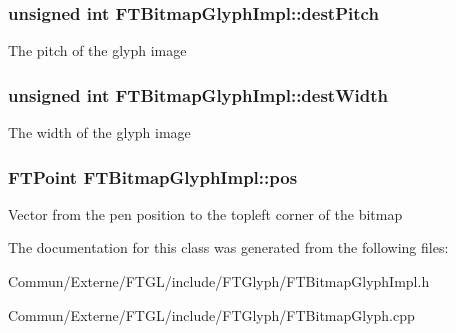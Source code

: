 \subsubsection[{\texorpdfstring{dest\+Pitch}{destPitch}}]{\setlength{\rightskip}{0pt plus 5cm}unsigned int F\+T\+Bitmap\+Glyph\+Impl\+::dest\+Pitch\hspace{0.3cm}{\ttfamily [private]}}\hypertarget{class_f_t_bitmap_glyph_impl_adf2486f483a57fa6c2b58d12f68df6d2}{}\label{class_f_t_bitmap_glyph_impl_adf2486f483a57fa6c2b58d12f68df6d2}
The pitch of the glyph \textquotesingle{}image\textquotesingle{} 
\subsubsection[{\texorpdfstring{dest\+Width}{destWidth}}]{\setlength{\rightskip}{0pt plus 5cm}unsigned int F\+T\+Bitmap\+Glyph\+Impl\+::dest\+Width\hspace{0.3cm}{\ttfamily [private]}}\hypertarget{class_f_t_bitmap_glyph_impl_aee68c29c0749aa4dff423954c72eb3d1}{}\label{class_f_t_bitmap_glyph_impl_aee68c29c0749aa4dff423954c72eb3d1}
The width of the glyph \textquotesingle{}image\textquotesingle{} 
\subsubsection[{\texorpdfstring{pos}{pos}}]{\setlength{\rightskip}{0pt plus 5cm}F\+T\+Point F\+T\+Bitmap\+Glyph\+Impl\+::pos\hspace{0.3cm}{\ttfamily [private]}}\hypertarget{class_f_t_bitmap_glyph_impl_acdbd483a1ecd327916a7673ba959f747}{}\label{class_f_t_bitmap_glyph_impl_acdbd483a1ecd327916a7673ba959f747}
Vector from the pen position to the topleft corner of the bitmap 

The documentation for this class was generated from the following files\+:\begin{DoxyCompactItemize}
\item 
Commun/\+Externe/\+F\+T\+G\+L/include/\+F\+T\+Glyph/F\+T\+Bitmap\+Glyph\+Impl.\+h\item 
Commun/\+Externe/\+F\+T\+G\+L/include/\+F\+T\+Glyph/F\+T\+Bitmap\+Glyph.\+cpp\end{DoxyCompactItemize}
